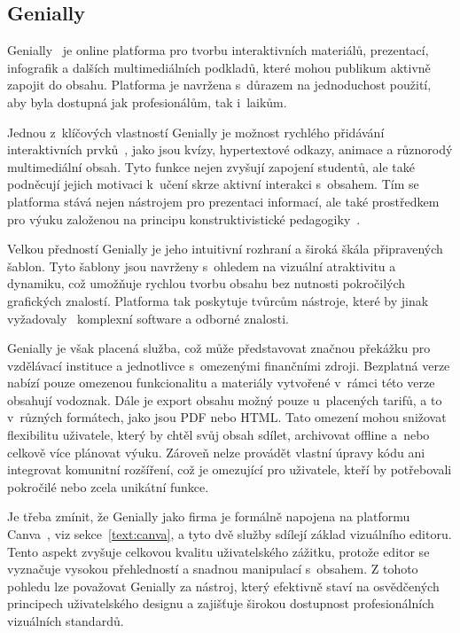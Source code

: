 \subsection{Genially}

Genially~\cite{genially} je online platforma pro tvorbu interaktivních materiálů, prezentací, infografik a dalších multimediálních podkladů, které mohou publikum aktivně zapojit do obsahu.
Platforma je navržena s~důrazem na jednoduchost použití, aby byla dostupná jak profesionálům, tak i~laikům.

Jednou z~klíčových vlastností Genially je možnost rychlého přidávání interaktivních prvků~\cite{genially}, jako jsou kvízy, hypertextové odkazy, animace a různorodý multimediální obsah. 
Tyto funkce nejen zvyšují zapojení studentů, ale také podněcují jejich motivaci k~učení skrze aktivní interakci s~obsahem. 
Tím se platforma stává nejen nástrojem pro prezentaci informací, ale také prostředkem pro výuku založenou na principu konstruktivistické pedagogiky~\cite{konstruktivismus}. 

Velkou předností Genially je jeho intuitivní rozhraní a široká škála připravených šablon.
Tyto šablony jsou navrženy s~ohledem na vizuální atraktivitu a dynamiku, což umožňuje rychlou tvorbu obsahu bez nutnosti pokročilých grafických znalostí.
Platforma tak poskytuje tvůrcům nástroje, které by jinak vyžadovaly~\cite{genially} komplexní software a odborné znalosti.

Genially je však placená služba, což může představovat značnou překážku pro vzdělávací instituce a jednotlivce s~omezenými finančními zdroji. 
Bezplatná verze nabízí pouze omezenou funkcionalitu a materiály vytvořené v~rámci této verze obsahují vodoznak.
Dále je export obsahu možný pouze u~placených tarifů, a to v~různých formátech, jako jsou PDF nebo HTML. 
Tato omezení mohou snižovat flexibilitu uživatele, který by chtěl svůj obsah sdílet, archivovat offline a~nebo celkově více plánovat výuku. 
Zároveň nelze provádět vlastní úpravy kódu ani integrovat komunitní rozšíření, což je omezující pro uživatele, kteří by potřebovali pokročilé nebo zcela unikátní funkce.

Je třeba zmínit, že Genially jako firma je formálně napojena na platformu Canva~\cite{genially}, viz sekce~\ref{text:canva}, a tyto dvě služby sdílejí základ vizuálního editoru. 
Tento aspekt zvyšuje celkovou kvalitu uživatelského zážitku, protože editor se vyznačuje vysokou přehledností a snadnou manipulací s~obsahem. 
Z tohoto pohledu lze považovat Genially za nástroj, který efektivně staví na osvědčených principech uživatelského designu a zajišťuje širokou dostupnost profesionálních vizuálních standardů.

